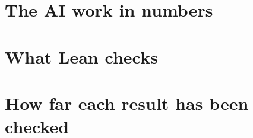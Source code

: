 \documentclass[12pt,oneside,openany]{book}
\numberwithin{equation}{section}
\theoremstyle{nogostyle}
\theoremstyle{definition}
\begin{document}
\chapter{The AI work in numbers}\label{S:appendix-ai-statistics}



\chapter{What Lean checks}\label{S:appendix-lean-checks}



\chapter{How far each result has been checked}\label{S:appendix-check-status}



\backmatter



\printindex
\end{document}
